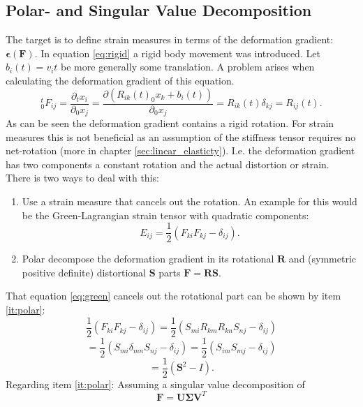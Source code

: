 \documentclass[m,times]{cgMA}
\begin{document}
\subsection{Polar- and Singular Value Decomposition}\label{sec:svd}
The target is to define strain measures in terms of the deformation gradient: $\boldsymbol{\epsilon}(\boldsymbol{F})$. In equation \ref{eq:rigid} a rigid body movement was introduced. Let $b_i(t) = v_it$ be more generally some translation. A problem arises when calculating the deformation gradient of this equation.
\begin{equation}
  ^t_0F_{ij} = \frac{\partial{_tx_i}}{\partial_0x_j} = \frac{\partial (R_{ik}(t)_0x_k+b_i(t))}{\partial _0x_j} = R_{ik}(t) \delta_{kj} = R_{ij}(t).
\end{equation}
As can be seen the deformation gradient contains a rigid rotation. For strain measures this is not beneficial as an assumption of the stiffness tensor requires no net-rotation (more in chapter \ref{sec:linear_elasticty}). I.e. the deformation gradient has two components a constant rotation and the actual distortion or strain. There is two ways to deal with this:
\begin{enumerate}
  \item  Use a strain measure that cancels out the rotation. An example for this would be the Green-Lagrangian strain tensor with quadratic components:
    \begin{equation}\label{eq:green}
      E _ { i j } = \frac { 1 } { 2 } \left( F _ { k i } F _ { k j } - \delta _ { i j } \right).
    \end{equation}
  \item \label{it:polar} Polar decompose the deformation gradient in its rotational $\boldsymbol{R}$ and (symmetric positive definite) distortional $\boldsymbol{S}$ parts $\boldsymbol{F}=\boldsymbol{R}\boldsymbol{S}$.
\end{enumerate}
That equation \ref{eq:green} cancels out the rotational part can be shown by item \ref{it:polar}:
$$ \frac { 1 } { 2 } \left( F _ { k i } F _ { k j } - \delta _ { i j } \right) = \frac { 1 } { 2 } \left( S _ {m i}R_{k m} R _ { k n} S_{n j} - \delta _ { i j } \right)$$
$$= \frac { 1 } { 2 } \left( S _ {m i} \delta_{mn} S_{n j} - \delta _ { i j } \right) = \frac { 1 } { 2 } \left( S _ {i m} S_{m j} - \delta _ { i j } \right)$$
$$= \frac{1}{2} \left(\boldsymbol{S}^2 - I \right).$$
Regarding item \ref{it:polar}: Assuming a singular value decomposition of
\begin{equation}\label{eq:svd}
  \boldsymbol{F} = \boldsymbol{U\Sigma V}^T
\end{equation}
\end{document}

